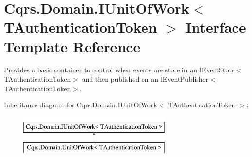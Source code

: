 \hypertarget{interfaceCqrs_1_1Domain_1_1IUnitOfWork}{}\section{Cqrs.\+Domain.\+I\+Unit\+Of\+Work$<$ T\+Authentication\+Token $>$ Interface Template Reference}
\label{interfaceCqrs_1_1Domain_1_1IUnitOfWork}


Provides a basic container to control when \hyperlink{}{events} are store in an I\+Event\+Store$<$\+T\+Authentication\+Token$>$ and then published on an I\+Event\+Publisher$<$\+T\+Authentication\+Token$>$.  


Inheritance diagram for Cqrs.\+Domain.\+I\+Unit\+Of\+Work$<$ T\+Authentication\+Token $>$\+:\begin{figure}[H]
\begin{center}
\leavevmode
\includegraphics[height=2.000000cm]{interfaceCqrs_1_1Domain_1_1IUnitOfWork}
\end{center}
\end{figure}
